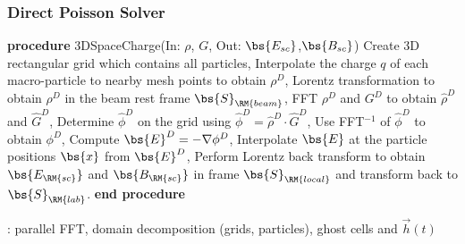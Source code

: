\documentclass[xcolor=pdftex,table,10pt,yellow,mathserif]{beamer}
\begin{document}
\begin{frame}
		\frametitle{Direct Poisson Solver}
		\begin{block}{}
		\begin{algorithmic}[1]
		    \STATE \textbf{procedure} 3DSpaceCharge(In: $\rho$, $G$, Out: $\bs{E_{sc}}$,$\bs{B_{sc}}$)
       \STATE Create 3D rectangular grid which contains all particles, %
       \STATE Interpolate the charge $q$ of each macro-particle to nearby mesh points to obtain $\rho^D$, 
       \STATE Lorentz transformation to obtain $\rho^D$ in the beam rest frame $\bs{S}_{\RM{beam}}$,
       \STATE FFT $\rho^D$ and $G^D$ to obtain $\widehat{\rho}^D$ and $\widehat{G}^D$,
       \STATE Determine $\widehat{\phi}^D$ on the grid using $\widehat{\phi}^D = \widehat{\rho}^D \cdot \widehat{G}^D$,
       \STATE Use FFT$^{-1}$ of $\widehat{\phi }^D$ to obtain $\phi^D$,
       \STATE Compute $\bs{E}^D= -\nabla \phi^D$,
       \STATE Interpolate $\bs{E}$ at the particle positions $\bs{x}$ from $\bs{E}^D$,
       \STATE Perform Lorentz back transform to obtain $\bs{E_{\RM{sc}}}$ and $\bs{B_{\RM{sc}}}$ in  frame $\bs{S}_{\RM{local}}$ and transform back  to $\bs{S}_{\RM{lab}}$.
       \STATE \textbf{end procedure}	
			
					\end{algorithmic}
		\end{block}
\alert{\ippl: parallel FFT, domain decomposition (grids, particles), ghost cells and $\vec{h}(t)$}
	\end{frame}
\end{document}

